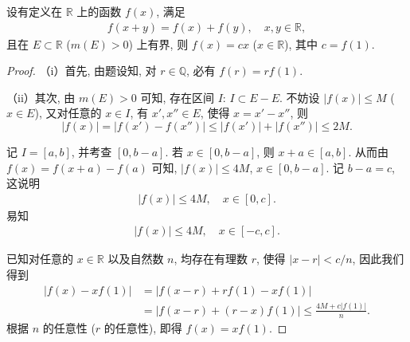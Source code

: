 \documentclass[../../main.tex]{subfiles}
\begin{document}
\begin{proposition}
设有定义在 $\mathbb{R}$ 上的函数 $f(x)$, 满足
\begin{align*}
f(x + y) = f(x) + f(y),\quad x,y\in\mathbb{R},
\end{align*}
且在 $E\subset\mathbb{R}$ ($m(E)>0$) 上有界, 则 $f(x)=cx$ ($x\in\mathbb{R}$), 其中 $c = f(1)$.

\end{proposition}
\begin{proof}
（i）首先, 由题设知, 对 $r\in\mathbb{Q}$, 必有 $f(r)=rf(1)$.

（ii）其次, 由 $m(E)>0$ 可知, 存在区间 $I$: $I\subset E - E$. 不妨设 $|f(x)|\leqslant M$ ($x\in E$), 又对任意的 $x\in I$, 有 $x',x''\in E$, 使得 $x = x' - x''$, 则
\[
|f(x)| = |f(x') - f(x'')|\leqslant |f(x')| + |f(x'')|\leqslant 2M.
\]

记 $I = [a,b]$, 并考查 $[0,b - a]$. 若 $x\in [0,b - a]$, 则 $x + a\in [a,b]$. 从而由 $f(x) = f(x + a) - f(a)$ 可知, $|f(x)|\leqslant 4M$, $x\in [0,b - a]$. 记 $b - a = c$, 这说明
\begin{align*}
|f(x)|\leqslant 4M,\quad x\in [0,c].
\end{align*}
易知
\begin{align*}
|f(x)|\leqslant 4M,\quad x\in [-c,c].
\end{align*}

已知对任意的 $x\in\mathbb{R}$ 以及自然数 $n$, 均存在有理数 $r$, 使得 $|x - r|<c/n$, 因此我们得到
\begin{align*}
|f(x) - xf(1)|&=|f(x - r) + rf(1) - xf(1)|\\
&=|f(x - r) + (r - x)f(1)|\leqslant\frac{4M + c|f(1)|}{n}.
\end{align*}
根据 $n$ 的任意性 ($r$ 的任意性), 即得 $f(x)=xf(1)$. 
\end{proof}
\end{document}
